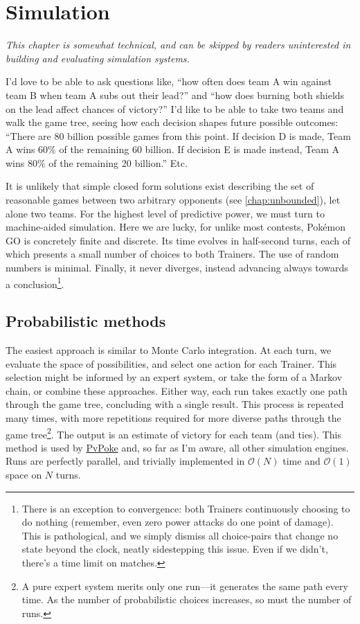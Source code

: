 \chapter{Simulation\label{chap:simul}}
\textit{This chapter is somewhat technical, and can be skipped by readers
 uninterested in building and evaluating simulation systems.}
 \bigskip

I'd love to be able to ask questions like, ``how often does team A win against
  team B when team A subs out their lead?''
  and ``how does burning both shields on the lead affect chances of victory?''
I'd like to be able to take two teams and walk the game tree, seeing how
  each decision shapes future possible outcomes: ``There are 80 billion
  possible games from this point. If decision D is made, Team A
  wins 60\% of the remaining 60 billion. If decision E is made instead,
  Team A wins 80\% of the remaining 20 billion.'' Etc.

It is unlikely that simple closed form solutions exist describing
 the set of reasonable games between two arbitrary opponents (see \autoref{chap:unbounded}),
 let alone two teams.
For the highest level of predictive power, we must turn to machine-aided simulation.
Here we are lucky, for unlike most contests, Pokémon GO is concretely finite and discrete.
Its time evolves in half-second turns, each of which presents a small number of choices
  to both Trainers.
The use of random numbers is minimal.
Finally, it never diverges, instead advancing always towards a conclusion\footnote{There
  is an exception to convergence: both Trainers continuously choosing to do nothing (remember,
  even zero power attacks do one point of damage). This is pathological, and we
  simply dismiss all choice-pairs that change no state beyond the clock, neatly sidestepping this issue.
  Even if we didn't, there's a time limit on matches.}.

\section{Probabilistic methods\label{sec:probsimul}}
The easiest approach is similar to Monte Carlo integration.
At each turn, we evaluate the space of possibilities, and select one action for each Trainer.
This selection might be informed by an expert system, or take the form of a Markov chain,
 or combine these approaches.
Either way, each run takes exactly one path through the game tree, concluding with a single result.
This process is repeated many times, with more repetitions required for more
 diverse paths through the game tree\footnote{A pure expert system merits only
 one run---it generates the same path every time. As the number of
 probabilistic choices increases, so must the number of runs.}.
The output is an estimate of victory for each team (and ties).
This method is used by \href{https://pvpoke.com}{PvPoke} and, so far as I'm aware,
 all other simulation engines.
Runs are perfectly parallel, and trivially implemented in $\mathcal{O}(N)$ time
 and $\mathcal{O}(1)$ space on $N$ turns.

